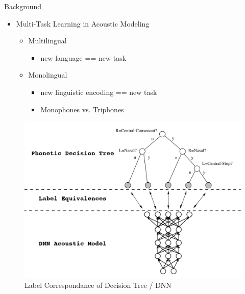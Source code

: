 \documentclass[final]{beamer} %
\begin{document}
\begin{frame}
\begin{columns}
\begin{column}{0.22\textwidth}
{        \vspace{.5cm}

        \begin{block}{\boxnumber Background}
          \begin{itemize}
          \item Multi-Task Learning in Acoustic Modeling
            \begin{itemize}
            \item Multilingual
              \begin{itemize}
              \item new language == new task
              \end{itemize}
            \item Monolingual
              \begin{itemize}
              \item new linguistic encoding == new task
                \item Monophones vs. Triphones
              \end{itemize}
            \end{itemize}     
          \end{itemize}
        \end{block}
        \vspace{.5cm}

        \vspace{.5cm}

        \begin{figure}[!htbp]
          \centering
          \includegraphics[width=\linewidth]{figs/tree-net.png}
          \caption{Label Correspondance of Decision Tree / DNN }
          \label{fig:mtl-dnn}
          \endminipage\hfill
        \end{figure}

}
\end{column}
\end{columns}
\end{frame}
\end{document}
